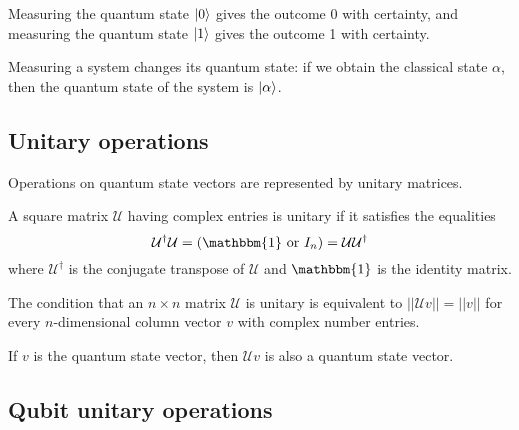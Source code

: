 \documentclass{report}
\begin{document}
Measuring the quantum state $\ket{0}$ gives the outcome 0 with certainty, and measuring the quantum state $\ket{1}$ gives the outcome 1 with certainty.


Measuring a system changes its quantum state: if we obtain the classical state $\alpha$, then the quantum state of the system is $\ket{\alpha}$.


\subsection{Unitary operations}
Operations on quantum state vectors are represented by unitary matrices.

\bigbreak
A square matrix $\mathcal{U}$ having complex entries is unitary if it satisfies the equalities
\begin{equation*}
    \mathcal{U}^\dagger\mathcal{U}=(\mathbbm{1}\text{ or }I_n)=\mathcal{U}\mathcal{U}^\dagger
\end{equation*}
where $\mathcal{U}^\dagger$ is the conjugate transpose of $\mathcal{U}$ and $\mathbbm{1}$ is the identity matrix.

\bigbreak

The condition that an $n\times n$ matrix $\mathcal{U}$ is unitary is equivalent to $||\mathcal{U}v||=||v||$ for every $n$-dimensional column vector $v$ with complex number entries.

\bigbreak

If $v$ is the quantum state vector, then $\mathcal{U}v$ is also a quantum state vector.

\newpage

\subsection{Qubit unitary operations}
\end{document}

